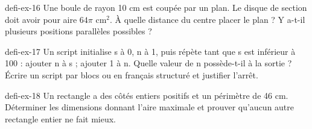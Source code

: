 \begin{blocEdition}{defi-ex-16}
Une boule de rayon 10 cm est coupée par un plan. Le disque de section doit avoir pour aire $64\pi$ cm$^2$. À quelle distance du centre placer le plan ? Y a-t-il plusieurs positions parallèles possibles ?\label{fig-defi-16}

\end{blocEdition}
\begin{blocEdition}{defi-ex-17}
Un script initialise s à 0, n à 1, puis répète tant que s est inférieur à 100 : ajouter n à s ; ajouter 1 à n. Quelle valeur de n possède-t-il à la sortie ? Écrire un script par blocs ou en français structuré et justifier l’arrêt.
\end{blocEdition}
\begin{blocEdition}{defi-ex-18}
Un rectangle a des côtés entiers positifs et un périmètre de 46 cm. Déterminer les dimensions donnant l’aire maximale et prouver qu’aucun autre rectangle entier ne fait mieux.
\end{blocEdition}
